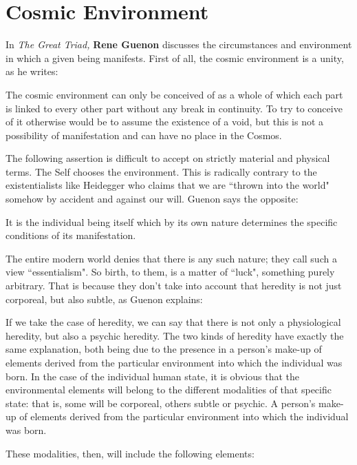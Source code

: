 \section{Cosmic Environment}

In \emph{The Great Triad,} \textbf{Rene Guenon} discusses the circumstances and environment in which a given being manifests. First of all, the cosmic environment is a unity, as he writes:

\begin{quotex}
The cosmic environment can only be conceived of as a whole of which each part is linked to every other part without any break in continuity. To try to conceive of it otherwise would be to assume the existence of a void, but this is not a possibility of manifestation and can have no place in the Cosmos.

\end{quotex} 

The following assertion is difficult to accept on strictly material and physical terms. The Self chooses the environment. This is radically contrary to the existentialists like Heidegger who claims that we are ``thrown into the world" somehow by accident and against our will. Guenon says the opposite:

\begin{quotex}
It is the individual being itself which by its own nature determines the specific conditions of its manifestation.

\end{quotex}
The entire modern world denies that there is any such nature; they call such a view ``essentialism". So birth, to them, is a matter of ``luck", something purely arbitrary. That is because they don't take into account that heredity is not just corporeal, but also subtle, as Guenon explains:

\begin{quotex}
If we take the case of heredity, we can say that there is not only a physiological heredity, but also a psychic heredity. The two kinds of heredity have exactly the same explanation, both being due to the presence in a person's make-up of elements derived from the particular environment into which the individual was born. In the case of the individual human state, it is obvious that the environmental elements will belong to the different modalities of that specific state: that is, some will be corporeal, others subtle or psychic. A person's make-up of elements derived from the particular environment into which the individual was born. 

\end{quotex}
These modalities, then, will include the following elements:

